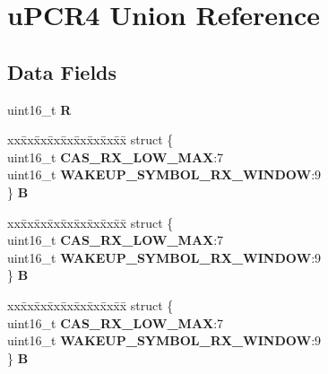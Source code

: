 \hypertarget{unionuPCR4}{}\section{u\+P\+C\+R4 Union Reference}
\label{unionuPCR4}
\subsection*{Data Fields}
\begin{DoxyCompactItemize}
\item 
\mbox{\label{unionuPCR4_ac493f31e9dbd5464b20ba315d0432391}} 
uint16\+\_\+t {\bfseries R}
\item 
\mbox{\label{unionuPCR4_a130b51ed04eb457df2fdbf91a7660641}} 
\begin{tabbing}
xx\=xx\=xx\=xx\=xx\=xx\=xx\=xx\=xx\=\kill
struct \{\\
\>uint16\_t {\bfseries CAS\_RX\_LOW\_MAX}:7\\
\>uint16\_t {\bfseries WAKEUP\_SYMBOL\_RX\_WINDOW}:9\\
\} {\bfseries B}\\

\end{tabbing}\item 
\mbox{\label{unionuPCR4_a40f5159d1eaa88db3a44cc4a432785a5}} 
\begin{tabbing}
xx\=xx\=xx\=xx\=xx\=xx\=xx\=xx\=xx\=\kill
struct \{\\
\>uint16\_t {\bfseries CAS\_RX\_LOW\_MAX}:7\\
\>uint16\_t {\bfseries WAKEUP\_SYMBOL\_RX\_WINDOW}:9\\
\} {\bfseries B}\\

\end{tabbing}\item 
\mbox{\label{unionuPCR4_a88fd48093f51f3eb8d8e24a999aeafa5}} 
\begin{tabbing}
xx\=xx\=xx\=xx\=xx\=xx\=xx\=xx\=xx\=\kill
struct \{\\
\>uint16\_t {\bfseries CAS\_RX\_LOW\_MAX}:7\\
\>uint16\_t {\bfseries WAKEUP\_SYMBOL\_RX\_WINDOW}:9\\
\} {\bfseries B}\\


\end{tabbing}
\end{DoxyCompactItemize}

